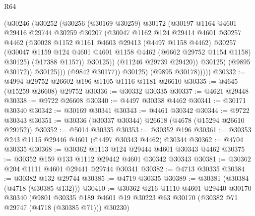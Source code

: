 \begin{lexlean}{R64}
\begin{coremodule}
                      (@30246
                        (@30252
                          (@30256
                            (@30169 @30259)
                            @30172
                            (@30197
                              @1164
                              @4601
                              @29416
                              @29744
                              @30259
                              @30207
                              (@30047
                                @1162
                                @124
                                @29414
                                @4601
                                @30257
                                @4462
                                (@30028
                                  @1152
                                  @1161
                                  @4603
                                  @29413
                                  (@4497 @1158 @4462)
                                  @30257
                                  (@30047
                                    @1159
                                    @124
                                    @4601
                                    @4601
                                    @1158
                                    @4462
                                    (@6662 @29752 @1154 @1158)
                                    @30125)
                                  (@17388 @1157))
                                @30125))
                            (@11246 @29739 @29420))
                          @30125)
                        (@9895 @30172))
                      @30125)))
                (@9842 @30177))
              @30125)
            (@9895 @30178)))))
@30332 := @4994 @29752 @26602 @196 @1105 @1116 @1181 @26610
@30335 := @4645 (@15259 @26608) @29752
@30336 := @30332 @30335
@30337 := @4621 @29448
@30338 := @9722 @26608
@30340 := @4497 @30338 @4462
@30341 := @30171 @30340
@30342 := @30169 @30341
@30343 := @4461 @30342
@30344 := @9722 @30343
@30351 := @30336 (@30337 @30344) @26618 (@4678 (@15294 @26610 @29752))
@30352 := @5014 @30335
@30353 := @30352 @196
@30361 := @30353 @243 @1115 @29446 @4601 (@4497 @30343 @4462) @30344
@30362 := @4704 @30335
@30368 := @30362 @1113 @124 @29444 @4601 @30343 @4462
@30375 := @30352 @159 @133 @1112 @29442 @4601 @30342 @30343
@30381 := @30362 @204 @1111 @4601 @29441 @29744 @30341
@30382 := @4713 @30335
@30384 := @30382 @132 @29744
@30385 := @4719 @30335
@30389 := @30381 (@30384 (@4718 (@30385 @132)))
@30410 := @30362
    @216
    @1110
    @4601
    @29440
    @30170
    @30340
    (@9801 @30335 @189 @4601 @19 @30223 @63 @30170 (@30382 @71 @29747 (@4718 (@30385 @71))) @30230)

\end{coremodule}
\end{lexlean}
